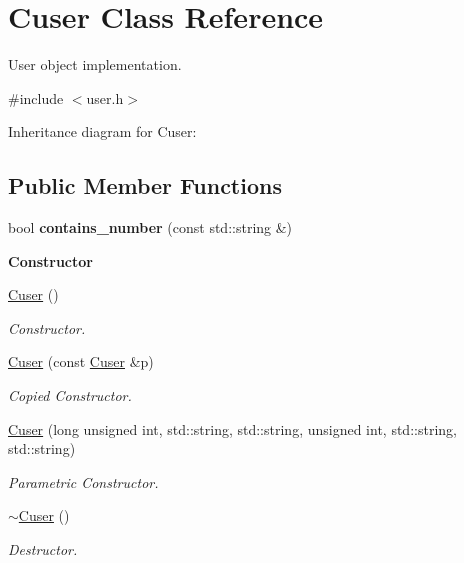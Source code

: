 \hypertarget{class_cuser}{}\section{Cuser Class Reference}
\label{class_cuser}


User object implementation.  




{\ttfamily \#include $<$user.\+h$>$}



Inheritance diagram for Cuser\+:
\subsection*{Public Member Functions}
\begin{DoxyCompactItemize}
\item 
bool {\bfseries contains\+\_\+number} (const std\+::string \&)\hypertarget{class_cuser_a110db4f47ac17223247019cbb6535fe1}{}\label{class_cuser_a110db4f47ac17223247019cbb6535fe1}

\end{DoxyCompactItemize}
\begin{Indent}{\bf Constructor}\par
\begin{DoxyCompactItemize}
\item 
\hyperlink{class_cuser_a28d26161b1076a72f30e41d52132e636}{Cuser} ()
\begin{DoxyCompactList}\small\item\em Constructor. \end{DoxyCompactList}\item 
\hyperlink{class_cuser_a6c2305c658e82cd50ec20778069b1539}{Cuser} (const \hyperlink{class_cuser}{Cuser} \&p)
\begin{DoxyCompactList}\small\item\em Copied Constructor. \end{DoxyCompactList}\item 
\hyperlink{class_cuser_af6aa55b35e256a681069a15b9a2931a2}{Cuser} (long unsigned int, std\+::string, std\+::string, unsigned int, std\+::string, std\+::string)
\begin{DoxyCompactList}\small\item\em Parametric Constructor. \end{DoxyCompactList}\item 
\hyperlink{class_cuser_a42e6967197e231f8a62d5d2c86451ca4}{$\sim$\+Cuser} ()\hypertarget{class_cuser_a42e6967197e231f8a62d5d2c86451ca4}{}\label{class_cuser_a42e6967197e231f8a62d5d2c86451ca4}

\begin{DoxyCompactList}\small\item\em Destructor. \end{DoxyCompactList}\end{DoxyCompactItemize}
\end{Indent}
